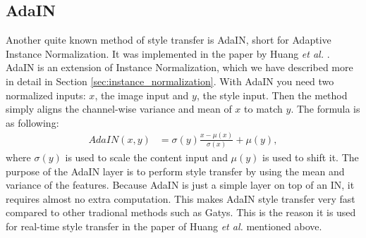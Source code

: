 \subsection{AdaIN}
Another quite known method of style transfer is AdaIN, short for Adaptive Instance Normalization. It was implemented in the paper by Huang \textit{et al.} \cite{X.Huang:1}. AdaIN is an extension of Instance Normalization, which we have described more in detail in Section \ref{sec:instance_normalization}. With AdaIN you need two normalized inputs: $x$, the image input and $y$, the style input. Then the method simply aligns the channel-wise variance and mean of $x$ to match $y$. The formula is as following: 
\begin{equation}
\begin{aligned}
\label{eq:batch_normalization}
    AdaIN(x,y)&=\sigma(y) \frac{x-\mu(x)}{\sigma(x)}+\mu(y),
\end{aligned}
\end{equation}
where $\sigma(y)$ is used to scale the content input and $\mu(y)$ is used to shift it. The purpose of the AdaIN layer is to perform style transfer by using the mean and variance of the features. Because AdaIN is just a simple layer on top of an IN, it requires almost no extra computation. This makes AdaIN style transfer very fast compared to other tradional methods such as Gatys. This is the reason it is used for real-time style transfer in the paper of Huang \textit{et al.} mentioned above. 